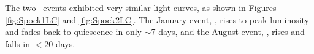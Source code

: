 The two \spock\ events exhibited very similar light curves, as shown in Figures \ref{fig:Spock1LC} and \ref{fig:Spock2LC}.  The January event, \spockone, rises to peak luminosity and fades back to quiescence in only $\sim$7 days, and the August event, \spocktwo, rises and falls in $<20$ days.  
  